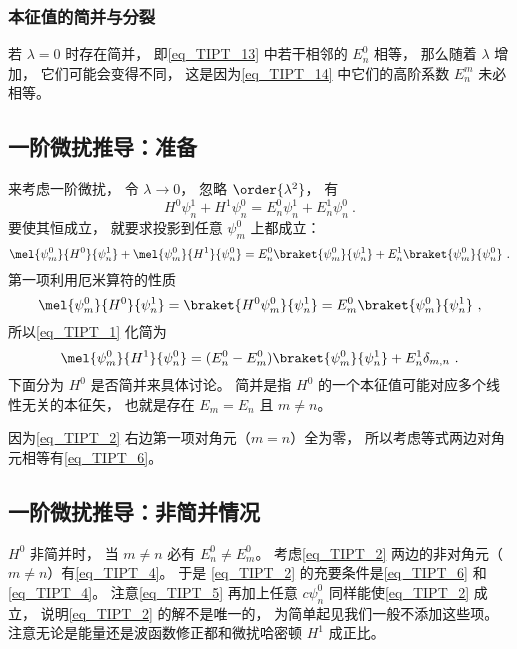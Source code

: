 \subsubsection{本征值的简并与分裂}
若 $\lambda = 0$ 时存在简并， 即\autoref{eq_TIPT_13} 中若干相邻的 $E_n^0$ 相等， 那么随着 $\lambda$ 增加， 它们可能会变得不同， 这是因为\autoref{eq_TIPT_14} 中它们的高阶系数 $E_n^m$ 未必相等。

\subsection{一阶微扰推导：准备}
来考虑一阶微扰， 令 $\lambda \to 0$， 忽略 $\order{\lambda^2}$， 有
\begin{equation}
H^0\psi_n^1 + H^1 \psi_n^0 = E_n^0 \psi_n^1 + E_n^1 \psi_n^0~.
\end{equation}
要使其恒成立， 就要求投影到任意 $\psi_m^0$ 上都成立：
\begin{equation}\label{eq_TIPT_1}
\mel{\psi_m^0}{H^0}{\psi_n^1} + \mel{\psi_m^0}{H^1}{\psi_n^0} = E_n^0 \braket{\psi_m^0}{\psi_n^1} + E_n^1 \braket{\psi_m^0}{\psi_n^0}~.
\end{equation}
第一项利用厄米算符的性质
\begin{equation}
\mel{\psi_m^0}{H^0}{\psi_n^1} = \braket{H^0\psi_m^0}{\psi_n^1} = E_m^0\braket{\psi_m^0}{\psi_n^1}~,
\end{equation}
所以\autoref{eq_TIPT_1} 化简为
\begin{equation}\label{eq_TIPT_2}
\mel{\psi_m^0}{H^1}{\psi_n^0} = (E_n^0 - E_m^0) \braket{\psi_m^0}{\psi_n^1} + E_n^1 \delta_{m,n}~.
\end{equation}
下面分为 $H^0$ 是否简并来具体讨论。 简并是指 $H^0$ 的一个本征值可能对应多个线性无关的本征矢， 也就是存在 $E_m=E_n$ 且 $m\ne n$。

因为\autoref{eq_TIPT_2} 右边第一项对角元（$m = n$）全为零， 所以考虑等式两边对角元相等有\autoref{eq_TIPT_6}。

\subsection{一阶微扰推导：非简并情况}\label{sub_TIPT_1}
$H^0$ 非简并时， 当 $m\ne n$ 必有 $E_n^0 \ne E_m^0$。  考虑\autoref{eq_TIPT_2} 两边的非对角元（$m \ne n$）有\autoref{eq_TIPT_4}。 于是 \autoref{eq_TIPT_2} 的充要条件是\autoref{eq_TIPT_6} 和\autoref{eq_TIPT_4}。 注意\autoref{eq_TIPT_5} 再加上任意 $c \psi_n^0$ 同样能使\autoref{eq_TIPT_2} 成立， 说明\autoref{eq_TIPT_2} 的解不是唯一的， 为简单起见我们一般不添加这些项。 注意无论是能量还是波函数修正都和微扰哈密顿 $H^1$ 成正比。

